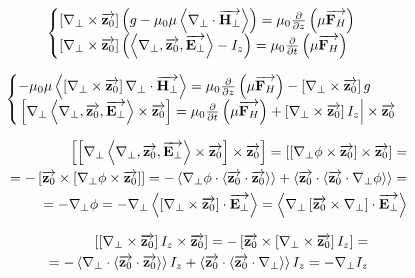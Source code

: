 \textcolor{lightgray}{ \begin{equation*} \begin{aligned}
\begin{cases} 
\crossprod{\nabla_\perp}{\vect{z_0}} \left(
g - \mu_0 \mu \dotprod{\nabla_\perp}{\vect{H_\perp}} \right) =
\mu_0 \partder{}{z} \left( \mu \vect{F_H} \right) \\
\crossprod{\nabla_\perp}{\vect{z_0}} \left(
\triple{\nabla_\perp}{\vect{z_0}}{\vect{E_\perp}} - I_z \right) = 
\mu_0 \partder{}{t} \left( \mu \vect{F_H} \right)
\end{cases}
\end{aligned} \end{equation*} }

\textcolor{lightgray}{ \begin{equation*} \begin{aligned}
\begin{cases} 
- \mu_0 \mu \dotprod{\crossprod{\nabla_\perp}{\vect{z_0}} \nabla_\perp}
{\vect{H_\perp}} = \mu_0 \partder{}{z} \left( \mu \vect{F_H} \right) -
\crossprod{\nabla_\perp}{\vect{z_0}} g \\
\left. \crossprod{\nabla_\perp 
\triple{\nabla_\perp}{\vect{z_0}}{\vect{E_\perp}}
}{\vect{z_0}} = \mu_0 \partder{}{t} \left( \mu \vect{F_H} \right) +
\crossprod{\nabla_\perp}{\vect{z_0}} I_z \right| \times \vect{z_0}
\end{cases}
\end{aligned} \end{equation*} }

\textcolor{lightgray}{ \begin{equation*} \begin{aligned}
\crossprod{ \crossprod
{\nabla_\perp \triple{\nabla_\perp}{\vect{z_0}}{\vect{E_\perp}}}
{\vect{z_0}} }{ \vect{z_0} } = \crossprod{ \crossprod{\nabla_\perp \phi}
{\vect{z_0}} }{\vect{z_0}} = \\ = - \crossprod{ \vect{z_0} }{ 
\crossprod{\nabla_\perp \phi}{\vect{z_0}} } = - \dotprod{\nabla_\perp \phi}
{ \dotprod{\vect{z_0}}{\vect{z_0}} } + \dotprod{\vect{z_0}}
{ \dotprod{\vect{z_0}}{\nabla_\perp \phi} } = \\ = - \nabla_\perp \phi = 
- \nabla_\perp \dotprod{\crossprod{\nabla_\perp}{\vect{z_0}}}{\vect{E_\perp}} = 
\dotprod{\nabla_\perp \crossprod{\vect{z_0}}{\nabla_\perp}}{\vect{E_\perp}}
\end{aligned} \end{equation*} }

\textcolor{lightgray}{ \begin{equation*} \begin{aligned}
\crossprod {\crossprod{\nabla_\perp}{\vect{z_0}} I_z}{\vect{z_0}} = 
- \crossprod {\vect{z_0}}{\crossprod{\nabla_\perp}{\vect{z_0}} I_z} = \\
= - \dotprod{{\nabla_\perp}}{\dotprod{\vect{z_0}}{\vect{z_0}}} I_z + 
\dotprod{\vect{z_0}}{\dotprod{\vect{z_0}}{{\nabla_\perp}}} I_z = 
- \nabla_\perp I_z 
\end{aligned} \end{equation*} }


